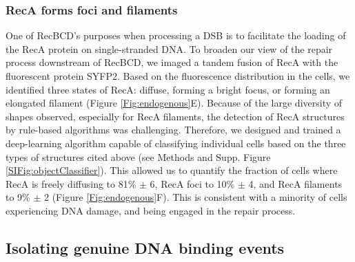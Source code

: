 \subsubsection*{RecA forms foci and filaments}
One of RecBCD's purposes when processing a DSB is to facilitate the loading of the RecA protein on single-stranded DNA. To broaden our view of the repair process downstream of RecBCD, we imaged a tandem fusion of RecA with the fluorescent protein SYFP2.\cite{} Based on the fluorescence distribution in the cells, we identified three states of RecA: diffuse, forming a bright focus, or forming an elongated filament (Figure \ref{Fig:endogenous}E). Because of the large diversity of shapes observed, especially for RecA filaments, the detection of RecA structures by rule-based algorithms was challenging. Therefore, we designed and trained a deep-learning algorithm capable of classifying individual cells based on the three types of structures cited above (see Methods and Supp. Figure \ref{SIFig:objectClassifier}). This allowed us to quantify the fraction of cells where RecA is freely diffusing to 81\% $\pm$ 6, RecA foci to 10\% $\pm$ 4, and RecA filaments to 9\% $\pm$ 2 (Figure \ref{Fig:endogenous}F). This is consistent with a minority of cells experiencing DNA damage, and being engaged in the repair process.

\subsection*{Isolating genuine DNA binding events}

